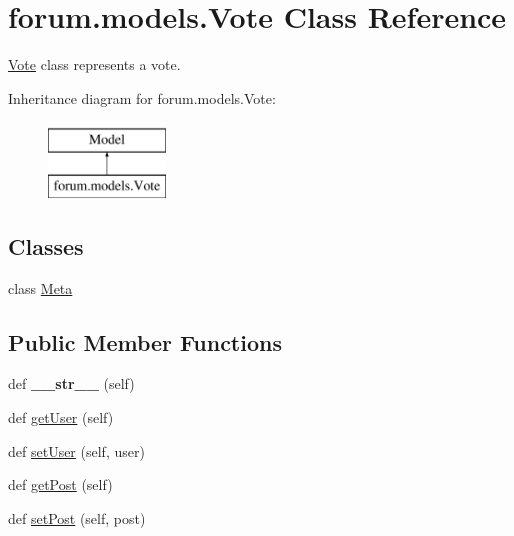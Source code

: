 \hypertarget{classforum_1_1models_1_1_vote}{}\section{forum.\+models.\+Vote Class Reference}
\label{classforum_1_1models_1_1_vote}


\mbox{\hyperlink{classforum_1_1models_1_1_vote}{Vote}} class represents a vote.  


Inheritance diagram for forum.\+models.\+Vote\+:\begin{figure}[H]
\begin{center}
\leavevmode
\includegraphics[height=2.000000cm]{classforum_1_1models_1_1_vote}
\end{center}
\end{figure}
\subsection*{Classes}
\begin{DoxyCompactItemize}
\item 
class \mbox{\hyperlink{classforum_1_1models_1_1_vote_1_1_meta}{Meta}}
\end{DoxyCompactItemize}
\subsection*{Public Member Functions}
\begin{DoxyCompactItemize}
\item 
\mbox{\label{classforum_1_1models_1_1_vote_af8c92939175fd095b65d375a85bf1470}} 
def {\bfseries \+\_\+\+\_\+str\+\_\+\+\_\+} (self)
\item 
def \mbox{\hyperlink{classforum_1_1models_1_1_vote_a92b43d21e35bfd4a1e485f4581d99c4f}{get\+User}} (self)
\item 
def \mbox{\hyperlink{classforum_1_1models_1_1_vote_a4412be7454022b6c02fb4c7056f2e7f9}{set\+User}} (self, user)
\item 
def \mbox{\hyperlink{classforum_1_1models_1_1_vote_af21f576041494dbf3fab8c9e1cc32ecc}{get\+Post}} (self)
\item 
def \mbox{\hyperlink{classforum_1_1models_1_1_vote_a505b7803c6886f32fd0d1afc23f78b43}{set\+Post}} (self, post)
\end{DoxyCompactItemize}

